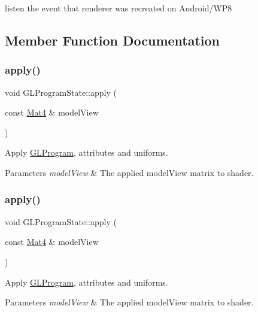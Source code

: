 listen the event that renderer was recreated on Android/\+W\+P8 

\subsection{Member Function Documentation}
\mbox{\label{classGLProgramState_a3bd47e0176e61945893c4227cf50dc8d}} 
\subsubsection{\texorpdfstring{apply()}{apply()}\hspace{0.1cm}{\footnotesize\ttfamily [1/2]}}
{\footnotesize\ttfamily void G\+L\+Program\+State\+::apply (\begin{DoxyParamCaption}\item[{const \hyperlink{classMat4}{Mat4} \&}]{model\+View }\end{DoxyParamCaption})}

Apply \hyperlink{classGLProgram}{G\+L\+Program}, attributes and uniforms. 
\begin{DoxyParams}{Parameters}
{\em model\+View} & The applied model\+View matrix to shader. \\
\hline
\end{DoxyParams}
\mbox{\label{classGLProgramState_a3bd47e0176e61945893c4227cf50dc8d}} 
\subsubsection{\texorpdfstring{apply()}{apply()}\hspace{0.1cm}{\footnotesize\ttfamily [2/2]}}
{\footnotesize\ttfamily void G\+L\+Program\+State\+::apply (\begin{DoxyParamCaption}\item[{const \hyperlink{classMat4}{Mat4} \&}]{model\+View }\end{DoxyParamCaption})}

Apply \hyperlink{classGLProgram}{G\+L\+Program}, attributes and uniforms. 
\begin{DoxyParams}{Parameters}
{\em model\+View} & The applied model\+View matrix to shader. \\
\hline
\end{DoxyParams}
\mbox{\label{classGLProgramState_af524cc2e3b621997336d5b58f221c624}} 
